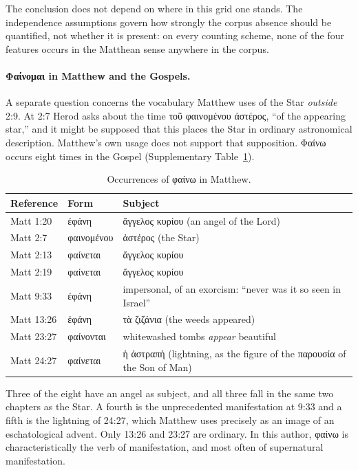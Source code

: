 \documentclass[11pt,a4paper]{article}
\newcommand{\grk}[1]{{\fontencoding{LGR}\selectfont #1}}
\newcommand{\grk}[1]{{\greekfont #1}}
\begin{document}
The conclusion does not depend on where in this grid one stands. The
independence assumptions govern how strongly the corpus absence should be
quantified, not whether it is present: on every counting scheme, none of the
four features occurs in the Matthean sense anywhere in the corpus.

\paragraph{\grk{Φαίνομαι} in Matthew and the Gospels.}

A separate question concerns the vocabulary Matthew uses of the Star
\emph{outside} 2:9. At 2:7 Herod asks about the time \grk{τοῦ φαινομένου
ἀστέρος}, ``of the appearing star,'' and it might be supposed that this places
the Star in ordinary astronomical description. Matthew's own usage does not
support that supposition. \grk{Φαίνω} occurs eight times in the Gospel (Supplementary Table~\ref{tab:phaino}).

\begin{table}[htbp]
\centering
\caption{Occurrences of \grk{φαίνω} in Matthew.}\label{tab:phaino}
\begin{tabular}{@{}llp{6.4cm}@{}}
\toprule
Reference & Form & Subject \\
\midrule
Matt 1:20  & \grk{ἐφάνη}     & \grk{ἄγγελος κυρίου} (an angel of the Lord) \\
Matt 2:7   & \grk{φαινομένου}& \grk{ἀστέρος} (the Star) \\
Matt 2:13  & \grk{φαίνεται}  & \grk{ἄγγελος κυρίου} \\
Matt 2:19  & \grk{φαίνεται}  & \grk{ἄγγελος κυρίου} \\
Matt 9:33  & \grk{ἐφάνη}     & impersonal, of an exorcism: ``never was it so seen in Israel'' \\
Matt 13:26 & \grk{ἐφάνη}     & \grk{τὰ ζιζάνια} (the weeds appeared) \\
Matt 23:27 & \grk{φαίνονται} & whitewashed tombs \emph{appear} beautiful \\
Matt 24:27 & \grk{φαίνεται}  & \grk{ἡ ἀστραπή} (lightning, as the figure of the \grk{παρουσία} of the Son of Man) \\
\bottomrule
\end{tabular}
\end{table}

Three of the eight have an angel as subject, and all three fall in the same two
chapters as the Star. A fourth is the unprecedented manifestation at 9:33 and a
fifth is the lightning of 24:27, which Matthew uses precisely as an image of an
eschatological advent. Only 13:26 and 23:27 are ordinary. In this author,
\grk{φαίνω} is characteristically the verb of manifestation, and most often of
supernatural manifestation.
\end{document}
